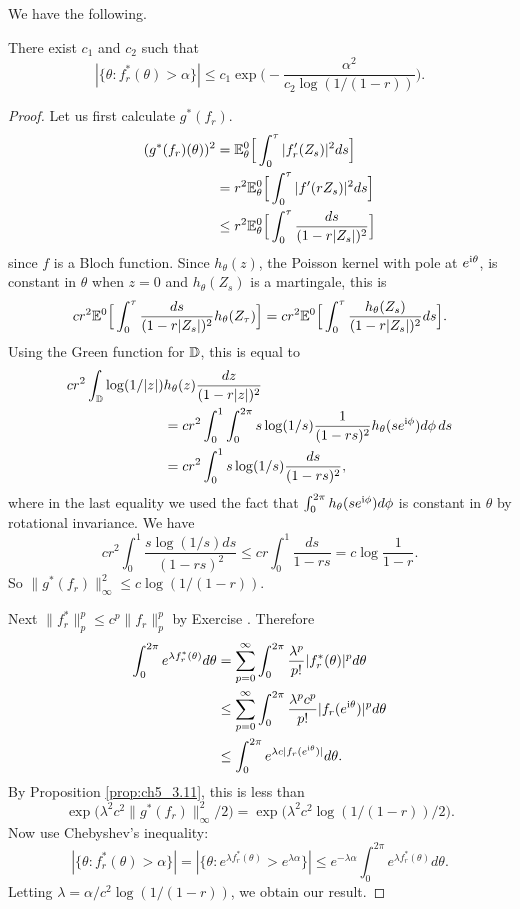 We have the following.

\begin{proposition}\label{prop:ch5_3.12}
There exist $c_1$ and $c_2$ such that
\[
    |\{\theta : f_r^*(\theta) > \alpha\}| \leq c_1\exp\Big(-\frac{\alpha^2}{c_2\log(1/(1-r))}\Big).
\]
\end{proposition}

\begin{proof}
Let us first calculate $g^*(f_r)$.
\begin{align*}
    (g^*(f_r)(\theta))^2 &= \mathbb{E}_\theta^0\Big[\int_0^\tau |f'_r(Z_s)|^2ds\Big] \\
    &= r^2\mathbb{E}_\theta^0\Big[\int_0^\tau |f'(rZ_s)|^2 ds\Big] \\
    &\leq r^2\mathbb{E}_\theta^0\Big[\int_0^\tau \frac{ds}{(1-r|Z_s|)^2}\Big]
\end{align*}
since $f$ is a Bloch function. Since $h_\theta(z)$, the Poisson kernel with pole at $e^{\mathrm{i}\theta}$, is constant in $\theta$ when $z = 0$ and $h_\theta(Z_s)$ is a martingale, this is
\[
    cr^2\mathbb{E}^0\Big[\int_0^\tau \frac{ds}{(1-r|Z_s|)^2}h_\theta(Z_\tau)\Big] = cr^2\mathbb{E}^0\Big[\int_0^\tau \frac{h_\theta(Z_s)}{(1-r|Z_s|)^2}ds\Big].
\]
Using the Green function for $\mathbb{D}$, this is equal to
\begin{align*}
    cr^2\int_{\mathbb{D}} \log(1/|z|) &h_\theta(z)\frac{dz}{(1-r|z|)^2} \\
    &= cr^2\int_0^1\int_0^{2\pi} s\log(1/s)\frac{1}{(1-rs)^2}h_\theta(se^{\mathrm{i}\phi})d\phi\,ds \\
    &= cr^2\int_0^1 s\log(1/s)\frac{ds}{(1-rs)^2},
\end{align*}
where in the last equality we used the fact that $\int_0^{2\pi} h_\theta(se^{\mathrm{i}\phi})d\phi$ is constant in $\theta$ by rotational invariance. We have
\[
    cr^2\int_0^1 \frac{s\log(1/s)ds}{(1-rs)^2} \leq cr\int_0^1 \frac{ds}{1-rs} = c\log\frac{1}{1-r}.
\]
So $\|g^*(f_r)\|_\infty^2 \leq c\log(1/(1-r))$.

Next $\|f_r^*\|_p^p \leq c^p\|f_r\|_p^p$ by Exercise . Therefore
\mpagebreak
\begin{align*}
    \int_0^{2\pi} e^{\lambda f_r^*(\theta)}d\theta &= \sum_{p=0}^{\infty}\int_0^{2\pi} \frac{\lambda^p}{p!}|f_r^*(\theta)|^p d\theta \\
    &\leq \sum_{p=0}^{\infty}\int_0^{2\pi} \frac{\lambda^pc^p}{p!}|f_r(e^{\mathrm{i}\theta})|^pd\theta \\
    &\leq \int_0^{2\pi} e^{\lambda c|f_r(e^{\mathrm{i}\theta})|}d\theta.
\end{align*}
By Proposition \ref{prop:ch5_3.11}, this is less than
\[
    \exp\Big(\lambda^2c^2\|g^*(f_r)\|_\infty^2/2\Big) = \exp\Big(\lambda^2c^2\log(1/(1-r))/2\Big).
\]
Now use Chebyshev's inequality:
\[
    |\{\theta : f_r^*(\theta) > \alpha\}| = |\{\theta : e^{\lambda f_r^*(\theta)} > e^{\lambda\alpha}\}| \leq e^{-\lambda\alpha}\int_0^{2\pi} e^{\lambda f_r^*(\theta)}d\theta.
\]
Letting $\lambda = \alpha/c^2\log(1/(1-r))$, we obtain our result.
\end{proof}

